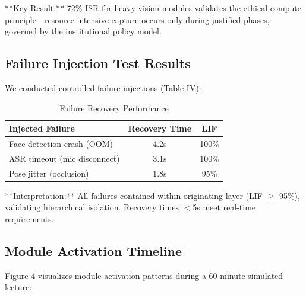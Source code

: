 \documentclass[conference]{IEEEtran}
\begin{document}
**Key Result:** 72\% ISR for heavy vision modules validates the ethical compute principle---resource-intensive capture occurs only during justified phases, governed by the institutional policy model.

\subsection{Failure Injection Test Results}
We conducted controlled failure injections (Table IV):

\begin{table}[htbp]
\caption{Failure Recovery Performance}
\begin{center}
\begin{tabular}{lcc}
\toprule
\textbf{Injected Failure} & \textbf{Recovery Time} & \textbf{LIF} \\
\midrule
Face detection crash (OOM) & 4.2s & 100\% \\
ASR timeout (mic disconnect) & 3.1s & 100\% \\
Pose jitter (occlusion) & 1.8s & 95\% \\
\bottomrule
\end{tabular}
\end{center}
\end{table}

**Interpretation:** All failures contained within originating layer (LIF $\geq$ 95\%), validating hierarchical isolation. Recovery times $<$5s meet real-time requirements.

\subsection{Module Activation Timeline}
Figure 4 visualizes module activation patterns during a 60-minute simulated lecture:
\end{document}
